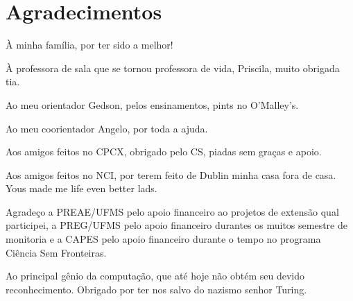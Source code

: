 
\chapter*{Agradecimentos} \label{Cap:Agradecimentos}
À minha família, por ter sido a melhor!

À professora de sala que se tornou professora de vida, Priscila, muito obrigada tia.

Ao meu orientador Gedson, pelos ensinamentos, pints no O'Malley's.

Ao meu coorientador Angelo, por toda a ajuda.

Aos amigos feitos no CPCX, obrigado pelo CS, piadas sem graças e apoio. 

Aos amigos feitos no NCI, por terem feito de Dublin minha casa fora de casa. Yous made me life even better lads.

Agradeço a PREAE/UFMS pelo apoio financeiro ao projetos de extensão qual participei, a PREG/UFMS pelo apoio financeiro durantes os muitos semestre de monitoria e a CAPES pelo apoio financeiro durante o tempo no programa Ciência Sem Fronteiras.

Ao principal gênio da computação, que até hoje não obtém seu devido reconhecimento. Obrigado por ter nos salvo do nazismo senhor Turing.



